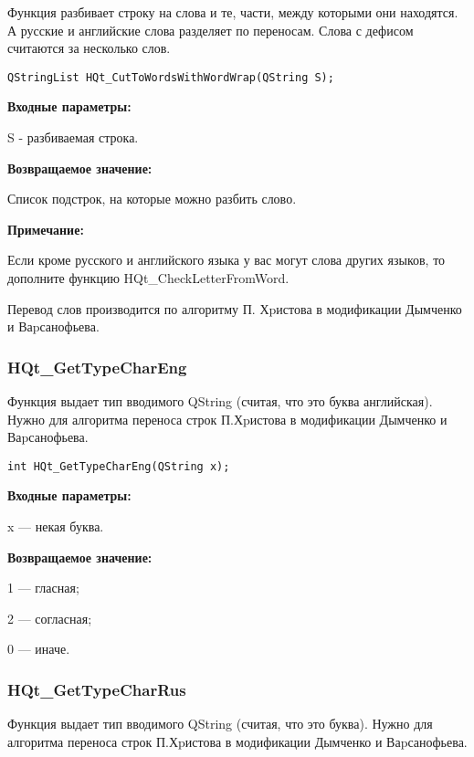 \documentclass[a4paper,12pt]{article}
\begin{document}
Функция разбивает строку на слова и те, части, между которыми они находятся. А русские и английские слова разделяет по переносам. Слова с дефисом считаются за несколько слов.


\begin{lstlisting}[label=code_syntax_HQt_CutToWordsWithWordWrap,caption=Синтаксис]
QStringList HQt_CutToWordsWithWordWrap(QString S);
\end{lstlisting}

\textbf{Входные параметры:}

S - разбиваемая строка.

\textbf{Возвращаемое значение:}
 
Список подстрок, на которые можно разбить слово.

\textbf{Примечание:}

     Если кроме русского и английского языка у вас могут слова других языков, то дополните функцию HQt\_CheckLetterFromWord.
	 
	 Перевод слов производится по алгоритму П. Хpистова в модификации Дымченко и Ваpсанофьева.


\subsubsection{HQt\_GetTypeCharEng}\label{HQt_GetTypeCharEng}

Функция выдает тип вводимого QString (считая, что это буква английская). Нужно для алгоритма переноса строк П.Хpистова в модификации Дымченко и Ваpсанофьева.


\begin{lstlisting}[label=code_syntax_HQt_GetTypeCharEng,caption=Синтаксис]
int HQt_GetTypeCharEng(QString x);
\end{lstlisting}

\textbf{Входные параметры:}

x --- некая буква.

\textbf{Возвращаемое значение:}

     1 --- гласная;
	 
     2 --- согласная;
	 
     0 --- иначе.


\subsubsection{HQt\_GetTypeCharRus}\label{HQt_GetTypeCharRus}

Функция выдает тип вводимого QString (считая, что это буква). Нужно для алгоритма переноса строк П.Хpистова в модификации Дымченко и Ваpсанофьева.
\end{document}
